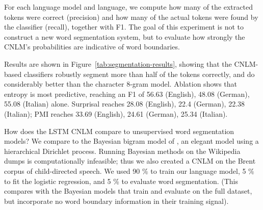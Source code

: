 

For each language model and language, we compute how many of the extracted tokens were correct (precision) and how many of the actual tokens were found by the classifier (recall), together with F1.
The goal of this experiment is not to construct a new word segmentation system, but to evaluate how strongly the CNLM's probabilities are indicative of word boundaries.

Results are shown in Figure~\ref{tab:segmentation-results}, showing that the CNLM-based classifiers robustly segment more than half of the tokens correctly, and do considerably better than the character 8-gram model.
Ablation shows that entropy is most predictive, reaching an F1 of 56.63 (English), 48.08 (German), 55.08 (Italian) alone.
Surprisal reaches 28.08 (English), 22.4 (German), 22.38 (Italian); PMI reaches 33.69 (English), 24.61 (German), 25.34 (Italian).

How does the LSTM CNLM compare to unsupervised word segmentation models?
We compare to the Bayesian bigram model of \cite{goldwater-bayesian-2009}, an elegant model using a hierarchical Dirichlet process.
Running Bayesian methods on the Wikipedia dumps is computationally infeasible; thus we also created a CNLM on the Brent corpus \cite{brent-efficient-1999} of child-directed speech.
We used 90 \% to train our language model, 5 \% to fit the logistic regression, and 5 \% to evaluate word segmentation.
(This compares with the Bayesian models that train and evaluate on the full dataset, but incorporate no word boundary information in their training signal).

